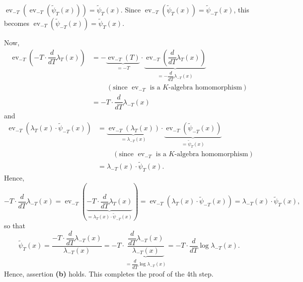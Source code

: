 \documentclass[numbers=enddot,12pt,final,onecolumn,notitlepage]{scrartcl}%
\begin{document}
$\operatorname*{ev}\nolimits_{-T}\left(  \operatorname*{ev}\nolimits_{-T}%
\left(  \widetilde{\psi}_{T}\left(  x\right)  \right)  \right)
=\widetilde{\psi}_{T}\left(  x\right)  $. Since $\operatorname*{ev}%
\nolimits_{-T}\left(  \widetilde{\psi}_{T}\left(  x\right)  \right)
=\widetilde{\psi}_{-T}\left(  x\right)  $, this becomes $\operatorname*{ev}%
\nolimits_{-T}\left(  \widetilde{\psi}_{-T}\left(  x\right)  \right)
=\widetilde{\psi}_{T}\left(  x\right)  $.

Now,%
\begin{align*}
\operatorname*{ev}\nolimits_{-T}\left(  -T\cdot\dfrac{d}{dT}\lambda_{T}\left(
x\right)  \right)   &  =-\underbrace{\operatorname*{ev}\nolimits_{-T}\left(
T\right)  }_{=-T}\cdot\underbrace{\operatorname*{ev}\nolimits_{-T}\left(
\dfrac{d}{dT}\lambda_{T}\left(  x\right)  \right)  }_{=-\dfrac{d}{dT}%
\lambda_{-T}\left(  x\right)  }\\
&  \ \ \ \ \ \ \ \ \ \ \left(  \text{since }\operatorname*{ev}\nolimits_{-T}%
\text{ is a }K\text{-algebra homomorphism}\right) \\
&  =-T\cdot\dfrac{d}{dT}\lambda_{-T}\left(  x\right)
\end{align*}
and%
\begin{align*}
\operatorname*{ev}\nolimits_{-T}\left(  \lambda_{T}\left(  x\right)
\cdot\widetilde{\psi}_{-T}\left(  x\right)  \right)   &
=\underbrace{\operatorname*{ev}\nolimits_{-T}\left(  \lambda_{T}\left(
x\right)  \right)  }_{=\lambda_{-T}\left(  x\right)  }\cdot
\underbrace{\operatorname*{ev}\nolimits_{-T}\left(  \widetilde{\psi}%
_{-T}\left(  x\right)  \right)  }_{=\widetilde{\psi}_{T}\left(  x\right)  }\\
&  \ \ \ \ \ \ \ \ \ \ \left(  \text{since }\operatorname*{ev}\nolimits_{-T}%
\text{ is a }K\text{-algebra homomorphism}\right) \\
&  =\lambda_{-T}\left(  x\right)  \cdot\widetilde{\psi}_{T}\left(  x\right)  .
\end{align*}
Hence,%
\[
-T\cdot\dfrac{d}{dT}\lambda_{-T}\left(  x\right)  =\operatorname*{ev}%
\nolimits_{-T}\left(  \underbrace{-T\cdot\dfrac{d}{dT}\lambda_{T}\left(
x\right)  }_{=\lambda_{T}\left(  x\right)  \cdot\widetilde{\psi}_{-T}\left(
x\right)  }\right)  =\operatorname*{ev}\nolimits_{-T}\left(  \lambda
_{T}\left(  x\right)  \cdot\widetilde{\psi}_{-T}\left(  x\right)  \right)
=\lambda_{-T}\left(  x\right)  \cdot\widetilde{\psi}_{T}\left(  x\right)  ,
\]
so that%
\[
\widetilde{\psi}_{T}\left(  x\right)  =\dfrac{-T\cdot\dfrac{d}{dT}\lambda
_{-T}\left(  x\right)  }{\lambda_{-T}\left(  x\right)  }=-T\cdot
\underbrace{\dfrac{\dfrac{d}{dT}\lambda_{-T}\left(  x\right)  }{\lambda
_{-T}\left(  x\right)  }}_{=\dfrac{d}{dT}\log\lambda_{-T}\left(  x\right)
}=-T\cdot\dfrac{d}{dT}\log\lambda_{-T}\left(  x\right)  .
\]
Hence, assertion \textbf{(b)} holds. This completes the proof of the 4th step.
\end{document}
